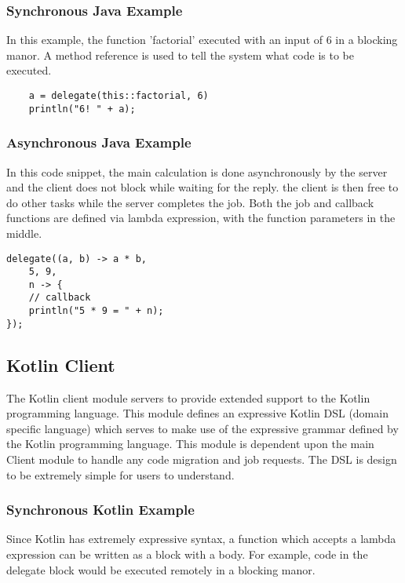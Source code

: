 \subsubsection{Synchronous Java Example}

In this example, the function 'factorial' executed with an input of 6
in a blocking manor.
A method reference is used to tell the system what
code is to be executed.

\begin{lstlisting}
    a = delegate(this::factorial, 6)
    println("6! " + a);
\end{lstlisting}

\subsubsection{Asynchronous Java Example}

In this code snippet, the main calculation is done asynchronously
by the server and the client does not block while waiting for the reply.
the client is then free to do other tasks while the server completes the job.
Both the job and callback functions are defined via lambda expression, with
the function parameters in the middle.

\begin{lstlisting}
delegate((a, b) -> a * b,
    5, 9,
    n -> {
    // callback
    println("5 * 9 = " + n);
});
\end{lstlisting}

\subsection{Kotlin Client}\label{subsec:kotlinClient}
The Kotlin client module servers to provide extended support to the Kotlin
programming language.
This module defines an expressive Kotlin DSL (domain specific language) which
serves to make use of the expressive grammar defined by the Kotlin programming language.
This module is dependent upon the main Client module to handle any code migration and job requests.
The DSL is design to be extremely simple for users to understand.

\subsubsection{Synchronous Kotlin Example}

Since Kotlin has extremely expressive syntax, a function which accepts a
lambda expression can be written as a block with a body.
For example, code in the delegate block would be executed remotely in a blocking manor.

